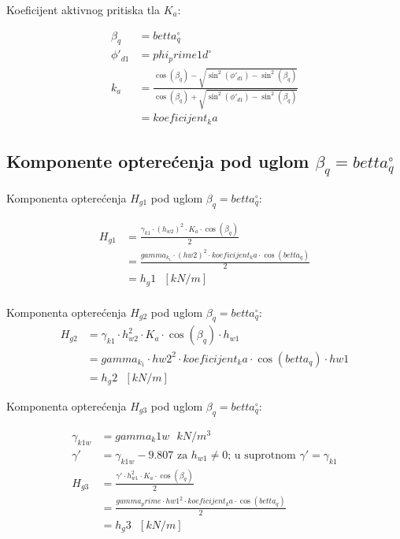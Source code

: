 \documentclass[a4paper, 11pt]{article}
\begin{document}
Koeficijent aktivnog pritiska tla $K_{a}$:

\begin{align*}
\beta_{q} &= betta_q ^\circ \\
\phi'_{d1} &= phi_prime1d ^\circ  \\
k_a &= \frac{\cos(\beta_q) - \sqrt{\sin^2(\phi'_{d1}) - \sin^2(\beta_q)}}{\cos(\beta_q) + \sqrt{\sin^2(\phi'_{d1}) - \sin^2(\beta_q)}} \\
	&= koeficijent_ka
\end{align*}

\subsection*{Komponente optere\'cenja pod uglom $\beta_{q} = betta_q ^ \circ$}

Komponenta optere\'cenja $H_{g1}$ pod uglom $\beta_{q} = betta_q ^ \circ$:

\begin{align*}
H_{g1} &= \frac{\gamma_{k1} \cdot \left(h_{w2} \right)^2 \cdot K_{a} \cdot \cos(\beta_q)}{2}\\
	   &=  \frac{gamma_k_1 \cdot \left(hw2 \right)^2 \cdot koeficijent_ka \cdot \cos(betta_q)}{2} \\
	   &= h_g1 \text{ } [kN/m] \\
\end{align*}

Komponenta optere\'cenja $H_{g2}$ pod uglom $\beta_{q} = betta_q ^ \circ$:
\begin{align*}
H_{g2} &= \gamma_{k1} \cdot h_{w2}^2 \cdot K_{a} \cdot \cos(\beta_{q}) \cdot h_{w1} \\
	   &= gamma_k_1 \cdot hw2^2 \cdot koeficijent_ka \cdot \cos (betta_q) \cdot hw1 \\
	   &= h_g2 \text{ } [kN/m]
\end{align*}

Komponenta optere\'cenja $H_{g3}$ pod uglom $\beta_{q} = betta_q ^ \circ$:

\begin{align*}
\gamma_{k1w} &= gamma_k1w \text{ } kN/m^3 \\
\gamma' &= \gamma_{k1w} - 9.807 \text{ za } h_{w1} \neq 0 \text{; u suprotnom } \gamma' = \gamma_{k1} \\
H_{g3}  &= \frac{\gamma' \cdot h_{w1} ^2 \cdot K_{a} \cdot \cos( \beta_{q})}{2} \\
		&= \frac{gamma_prime \cdot hw1 ^2 \cdot koeficijent_ka \cdot \cos(betta_q)}{2} \\
		&= h_g3 \text{ } [kN/m]
\end{align*}
\end{document}
